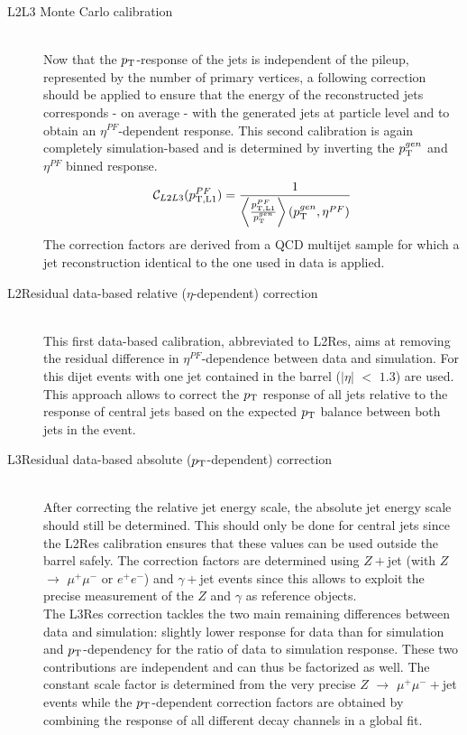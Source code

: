 \begin{myindentpar}
\begin{description}
    \item[L2L3 Monte Carlo calibration] \hfill \\
    Now that the $p_{\rm T}$-response of the jets is independent of the pileup, represented by the number of primary vertices, a following correction should be applied to ensure that the energy of the reconstructed jets corresponds - on average - with the generated jets at particle level and to obtain an $\eta^{PF}$-dependent response. This second calibration is again completely simulation-based and is determined by inverting the $p_{\rm T}^{gen}$ and $\eta^{PF}$ binned response.
    \begin{equation}
     \mathcal{C}_{L2L3}(p_{\rm T, L1}^{PF}) = \dfrac{1}{\left\langle \frac{p_{\rm T, L1}^{PF}}{p_{\rm T}^{gen}} \right\rangle \left(p_{\rm T}^{gen}, \eta^{PF} \right)}
    \end{equation}
    The correction factors are derived from a QCD multijet sample for which a jet reconstruction identical to the one used in data is applied.
    
    \item[L2Residual data-based relative ($\eta$-dependent) correction] \hfill \\
    This first data-based calibration, abbreviated to L2Res, aims at removing the residual difference in $\eta^{PF}$-dependence between data and simulation. For this dijet events with one jet contained in the barrel ($\vert \eta \vert$ $<$ $1.3$) are used. This approach allows to correct the $p_{\rm T}$ response of all jets relative to the response of central jets based on the expected $p_{\rm T}$ balance between both jets in the event.
        
    \item[L3Residual data-based absolute ($p_{\rm T}$-dependent) correction] \hfill \\
    After correcting the relative jet energy scale, the absolute jet energy scale should still be determined. This should only be done for central jets since the L2Res calibration ensures that these values can be used outside the barrel safely. 
    The correction factors are determined using $Z+$jet (with $Z$ $\rightarrow$ $\mu^{+}\mu^{-}$ or $e^{+}e^{-}$) and $\gamma+$jet events since this allows to exploit the precise measurement of the $Z$ and $\gamma$ as reference objects.
    \\
    The L3Res correction tackles the two main remaining differences between data and simulation: slightly lower response for data than for simulation and $p_{\rm T}$-dependency for the ratio of data to simulation response. These two contributions are independent and can thus be factorized as well. The constant scale factor is determined from the very precise $Z$ $\rightarrow$ $\mu^{+} \mu^{-}+$jet events while the $p_{\rm T}$-dependent correction factors are obtained by combining the response of all different decay channels in a global fit.
  \end{description}
\end{myindentpar}

